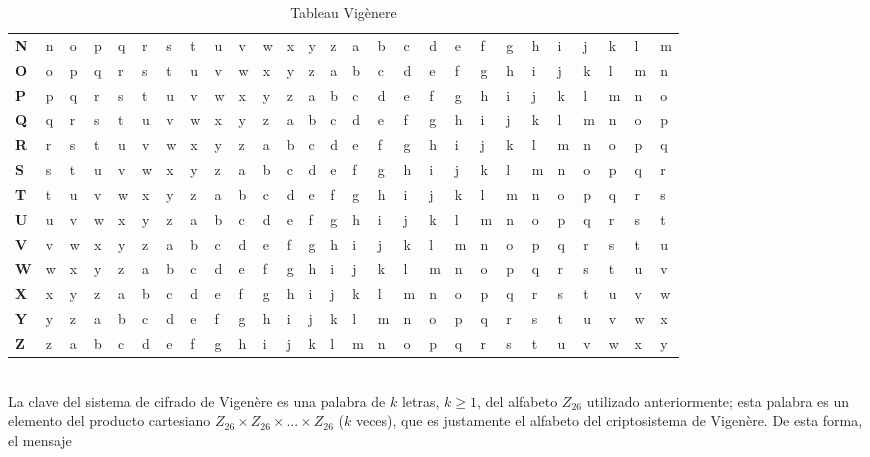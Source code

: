 \begin{table}
\begin{center}
\begin{sloppypar}
\begin{tabular}{|p{5pt}||p{3pt}p{3pt}p{3pt}p{3pt}p{3pt}p{3pt}p{3pt}p{3pt}p{3pt}p{3pt}p{3pt}p{3pt}p{3pt}p{3pt}p{3pt}p{3pt}p{3pt}p{3pt}p{3pt}p{3pt}p{3pt}p{3pt}p{3pt}p{3pt}p{3pt}p{3pt}|}
{\bf N} &n &o & p & q & r & s & t & u & v & w & x & y & z & a & b & c & d & e & f & g & h & i & j & k & l & m\\
{\bf O} &o &p & q & r & s & t & u & v & w & x & y & z & a & b & c & d & e & f & g & h & i & j & k & l & m & n\\
{\bf P} &p &q & r & s & t & u & v & w & x & y & z & a & b & c & d & e & f & g & h & i & j & k & l & m & n & o\\
{\bf Q} &q &r & s & t & u & v & w & x & y & z & a & b & c & d & e & f & g & h & i & j & k & l & m & n & o & p\\
{\bf R} &r &s & t & u & v & w & x & y & z & a & b & c & d & e & f & g & h & i & j & k & l & m & n & o & p & q\\
{\bf S} &s &t & u & v & w & x & y & z & a & b & c & d & e & f & g & h & i & j & k & l & m & n & o & p & q & r\\
{\bf T} &t &u & v & w & x & y & z & a & b & c & d & e & f & g & h & i & j & k & l & m & n & o & p & q & r & s\\
{\bf U} &u &v & w & x & y & z & a & b & c & d & e & f & g & h & i & j & k & l & m & n & o & p & q & r & s & t\\
{\bf V} &v &w & x & y & z & a & b & c & d & e & f & g & h & i & j & k & l & m & n & o & p & q & r & s & t & u\\
{\bf W} &w &x & y & z & a & b & c & d & e & f & g & h & i & j & k & l & m & n & o & p & q & r & s & t & u & v\\
{\bf X} &x &y & z & a & b & c & d & e & f & g & h & i & j & k & l & m & n & o & p & q & r & s & t & u & v & w\\
{\bf Y} &y &z & a & b & c & d & e & f & g & h & i & j & k & l & m & n & o & p & q & r & s & t & u & v & w & x\\
{\bf Z} &z &a & b & c & d & e & f & g & h & i & j & k & l & m & n & o & p & q & r & s & t & u & v & w & x & y\\ \hline
\end{tabular}
\end{sloppypar}
\caption{Tableau Vig\`enere}
\label{vig}
\end{center}
\end{table}
\\La clave del sistema de cifrado de Vigen\`ere es una palabra de
$k$ letras, $k\geq 1$, del alfabeto $Z_{26}$ utilizado anteriormente; esta 
palabra es un elemento del producto cartesiano 
$Z_{26}\times Z_{26}\times...\times Z_{26}$ ($k$ veces), que es justamente
el alfabeto del criptosistema de Vigen\`ere. De esta forma, el mensaje
